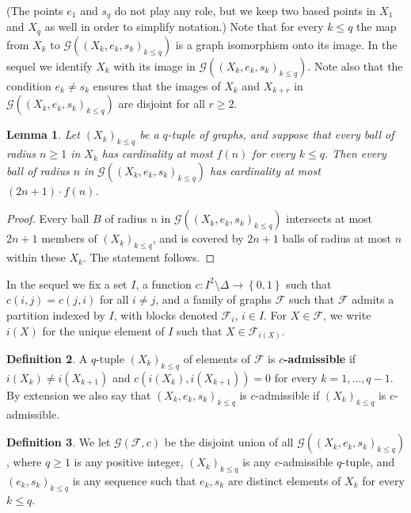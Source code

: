 \documentclass[11pt]{amsart}
\newcommand{\red}[1]{{\color{red}#1}}
\newcommand{\F}{\ensuremath{\mathcal{F}}}%
\theoremstyle{definition}
\newtheorem{defin}{Definition}[section]
\theoremstyle{plain}
\newtheorem{lem}[defin]{Lemma}
\theoremstyle{remark}
\begin{document}
(The points $e_1$ and $s_q$ do not play any role, but we keep two based points in  $X_1$ and $X_q$ as well in order to simplify notation.) Note that for every $k \leq q$ the map from $X_k$ to  $\mathcal{G}((X_k,e_k,s_k)_{k \leq q})$ is a graph isomorphism onto its image. In the sequel we identify $X_k$ with its image in $\mathcal{G}((X_k,e_k,s_k)_{k \leq q})$. Note also that the condition $e_k \neq s_k$ ensures that the images of $X_k$ and $X_{k+r}$ in $\mathcal{G}((X_k,e_k,s_k)_{k \leq q})$ are disjoint for all $r \geq 2$.


\begin{lem} \label{lem-growth-gluing}
	Let $(X_k)_{k \leq q}$ be a $q$-tuple of graphs, and suppose that every ball of radius $n \geq 1$ in $X_k$ has cardinality at most $f(n)$ for every $k \leq q$. Then every ball of radius $n$ in $\mathcal{G}((X_k,e_k,s_k)_{k \leq q})$ has cardinality at most $(2n+1) \cdot f(n)$. 
\end{lem}

\begin{proof}
	Every ball $B$ of radius $n$ in $\mathcal{G}((X_k,e_k,s_k)_{k \leq q})$  intersects at most $2n+1$ members of $(X_k)_{k \leq q}$, and is covered by $2n+1$ balls of radius at most $n$ within these $X_k$. The statement follows.
\end{proof}



In the sequel we fix a set $I$, a function $c:I^2 \setminus \Delta \to \left\lbrace 0,1 \right\rbrace$ such that $c(i,j) = c(j,i)$ for all $i \neq j$, and a family of graphs $\F$ such that $\F$ admits a partition indexed by $I$, with blocks denoted $\F_i$, $i \in I$. For $X \in \F$, we write $i(X)$ for the unique element of $I$ such that $X \in \F_{i(X)}$. 

\begin{defin} \label{defin-c-admissible}
A $q$-tuple $(X_k)_{k \leq q}$ of elements of $\F$ is \textbf{$c$-admissible} if $i(X_k) \neq i(X_{k+1})$ and $c(i(X_k),i(X_{k+1})) = 0$ for every $k=1,\dots,q-1$. By extension we also say that $(X_k,e_k,s_k)_{k \leq q}$ is $c$-admissible if $(X_k)_{k \leq q}$ is $c$-admissible.
\end{defin}

\begin{defin}
	We let $\mathcal{G}(\F,c)$ be the disjoint union of all $\mathcal{G}((X_k,e_k,s_k)_{k \leq q})$, where $q \geq 1$ is any positive integer, $(X_k)_{k \leq q}$ is any $c$-admissible $q$-tuple, and $(e_k,s_k)_{k \leq q}$ is any sequence such that $e_k,s_k$ are distinct elements of $X_k$ for every $k \leq q$.
\end{defin}
\end{document}
